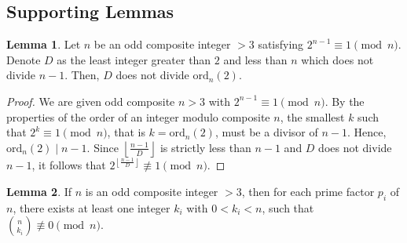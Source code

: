 \documentclass{article}
\theoremstyle{plain}
\theoremstyle{definition}
\newtheorem{lemma}{Lemma}
\begin{document}
\subsection{Supporting Lemmas}
\begin{lemma}
\label{lemma:1}
    Let $n$ be an odd composite integer $> 3$ satisfying $2^{n-1} \equiv 1 \pmod{n}$. Denote $D$ as the least integer greater than $2$ and less than $n$ which does not divide $n-1$. Then, $D$ does not divide $\text{ord}_n(2)$.
\end{lemma}
\begin{proof}
We are given odd composite $n > 3$ with $2^{n-1} \equiv 1 \pmod{n}$. By the properties of the order of an integer modulo composite $n$, the smallest $k$ such that $2^k \equiv 1 \pmod{n}$, that is $k = \text{ord}_n(2)$, must be a divisor of $n-1$. Hence, $\text{ord}_n(2) \mid n-1$. Since $\left\lfloor\frac{n-1}{D}\right\rfloor$ is strictly less than $n-1$ and $D$ does not divide $n-1$, it follows that $2^{\left\lfloor\frac{n-1}{D}\right\rfloor} \not\equiv 1 \pmod{n}$.
\end{proof}
\begin{lemma} \label{lemma:2}
If $n$ is an odd composite integer $>3$, then for each prime factor $p_i$ of $n$, there exists at least one integer $k_i$ with $0 < k_i < n$, such that $\binom{n}{k_i} \not\equiv 0 \pmod{n}$.
\end{lemma}
\end{document}
